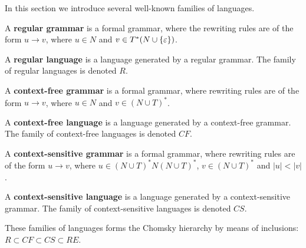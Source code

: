In this section we introduce several well-known families of languages.

\begin{definition}
A {\bf regular grammar} is a formal grammar, where the rewriting rules are of the form $u\rightarrow v$, where $u\in N$ and $v\in T^*(N\cup \{\varepsilon\})$.
\end{definition}

\begin{definition}
A {\bf regular language} is a language generated by a regular grammar. The family of regular languages is denoted $R$.
\end{definition}

\begin{definition}
A {\bf context-free grammar} is a formal grammar, where rewriting rules are of the form $u\rightarrow v$, where $u\in N$ and $v\in (N\cup T)^*$.
\end{definition}

\begin{definition}
A {\bf context-free language} is a language generated by a context-free grammar. The family of context-free languages is denoted $CF$.
\end{definition}

\begin{definition}
A {\bf context-sensitive grammar} is a formal grammar, where rewriting rules are of the form $u\rightarrow v$, where $u\in (N\cup T)^*N(N\cup T)^*$, $v\in (N\cup T)^*$ and $|u| < |v|$.
\end{definition}

\begin{definition}
A {\bf context-sensitive language} is a language generated by a context-sensitive grammar. The family of context-sensitive languages is denoted $CS$.
\end{definition}

These families of languages forms the Chomsky hierarchy by means of inclusions: $R \subset CF \subset CS \subset RE$.
